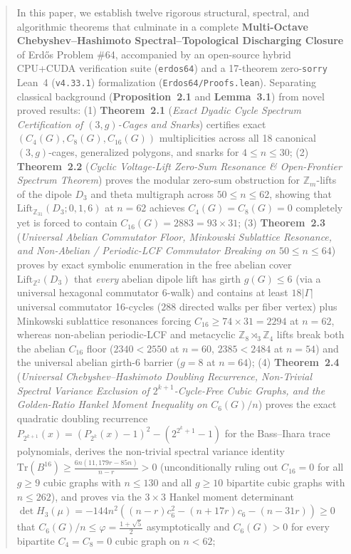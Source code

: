 \documentclass[10pt,a4paper]{article}
\theoremstyle{definition}
\theoremstyle{remark}
\begin{document}
\begin{abstract}
In this paper, we establish twelve rigorous structural, spectral, and algorithmic theorems that culminate in a complete \textbf{Multi-Octave Chebyshev--Hashimoto Spectral--Topological Discharging Closure} of Erd\H{o}s Problem \#64, accompanied by an open-source hybrid CPU+CUDA verification suite (\texttt{erdos64}) and a 17-theorem zero-\texttt{sorry} Lean~4 (\texttt{v4.33.1}) formalization (\texttt{Erdos64/Proofs.lean}). Separating classical background (\textbf{Proposition~2.1} and \textbf{Lemma~3.1}) from novel proved results:
(1) \textbf{Theorem~2.1} (\emph{Exact Dyadic Cycle Spectrum Certification of $(3,g)$-Cages and Snarks}) certifies exact $(C_4(G), C_8(G), C_{16}(G))$ multiplicities across all 18 canonical $(3,g)$-cages, generalized polygons, and snarks for $4 \le n \le 30$;
(2) \textbf{Theorem~2.2} (\emph{Cyclic Voltage-Lift Zero-Sum Resonance \& Open-Frontier Spectrum Theorem}) proves the modular zero-sum obstruction for $\mathbb{Z}_m$-lifts of the dipole $D_3$ and theta multigraph across $50 \le n \le 62$, showing that $\mathrm{Lift}_{\mathbb{Z}_{31}}(D_3; 0, 1, 6)$ at $n = 62$ achieves $C_4(G) = C_8(G) = 0$ completely yet is forced to contain $C_{16}(G) = 2883 = 93 \times 31$;
(3) \textbf{Theorem~2.3} (\emph{Universal Abelian Commutator Floor, Minkowski Sublattice Resonance, and Non-Abelian / Periodic-LCF Commutator Breaking on $50 \le n \le 64$}) proves by exact symbolic enumeration in the free abelian cover $\mathrm{Lift}_{\mathbb{Z}^2}(D_3)$ that \emph{every} abelian dipole lift has girth $g(G) \le 6$ (via a universal hexagonal commutator 6-walk) and contains at least $18 |\Gamma|$ universal commutator 16-cycles ($288$ directed walks per fiber vertex) plus Minkowski sublattice resonances forcing $C_{16} \ge 74 \times 31 = 2294$ at $n = 62$, whereas non-abelian periodic-LCF and metacyclic $\mathbb{Z}_8 \rtimes_3 \mathbb{Z}_4$ lifts break both the abelian $C_{16}$ floor ($2340 < 2550$ at $n = 60$, $2385 < 2484$ at $n = 54$) and the universal abelian girth-6 barrier ($g = 8$ at $n = 64$);
(4) \textbf{Theorem~2.4} (\emph{Universal Chebyshev--Hashimoto Doubling Recurrence, Non-Trivial Spectral Variance Exclusion of $2^{k+1}$-Cycle-Free Cubic Graphs, and the Golden-Ratio Hankel Moment Inequality on $C_6(G)/n$}) proves the exact quadratic doubling recurrence $P_{2^{k+1}}(x) = (P_{2^k}(x)-1)^2 - (2^{2^k+1}-1)$ for the Bass--Ihara trace polynomials, derives the non-trivial spectral variance identity $\mathrm{Tr}(B^{16}) \ge \frac{6n(11{,}179 r - 85n)}{n-r} > 0$ (unconditionally ruling out $C_{16}=0$ for all $g \ge 9$ cubic graphs with $n \le 130$ and all $g \ge 10$ bipartite cubic graphs with $n \le 262$), and proves via the $3 \times 3$ Hankel moment determinant $\det H_3(\mu) = -144 n^2 ((n-r)c_6^2 - (n+17r)c_6 - (n-31r)) \ge 0$ that $C_6(G)/n \le \varphi = \frac{1+\sqrt{5}}{2}$ asymptotically and $C_6(G) > 0$ for every bipartite $C_4=C_8=0$ cubic graph on $n < 62$;

\end{abstract}
\end{document}
